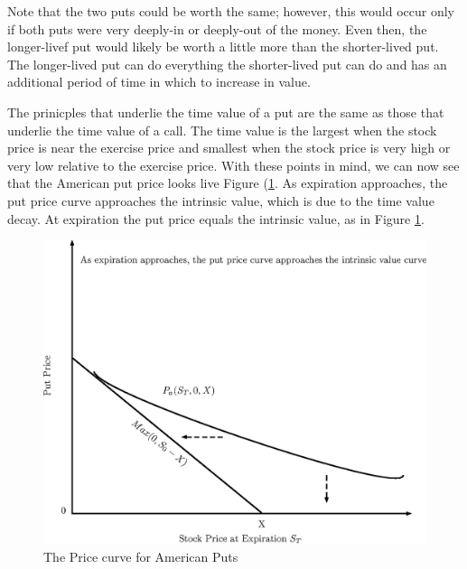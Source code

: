 \documentclass{book}
\theoremstyle{definition}
\theoremstyle{remark}
\begin{document}
            Note that the two puts could be worth the same; however, this would occur only if both puts were very deeply-in or deeply-out of the money. Even then, the longer-livef put would likely be worth a little more than the shorter-lived put. The longer-lived put can do everything the shorter-lived put can do and has an additional period of time in which to increase in value. 
                
            The prinicples that underlie the time value of a put are the same as those that underlie the time value of a call. The time value is the largest when the stock price is near the exercise price and smallest when the stock price is very high or very low relative to the exercise price. With these points in mind, we can now see that the American put price looks live Figure (\ref{fig:APutExp}. As expiration approaches, the put price curve approaches the intrinsic value, which is due to the time value decay. At expiration the put price equals the intrinsic value, as in Figure \ref{fig:APutExp}. 

                \begin{figure}[h]
                    \centering
                        \includegraphics[scale=0.45]{images/fig:APutExp.eps}
                    \caption{The Price curve for American Puts}
                    \label{fig:APutExp}                
                \end{figure}
            
\end{document}
